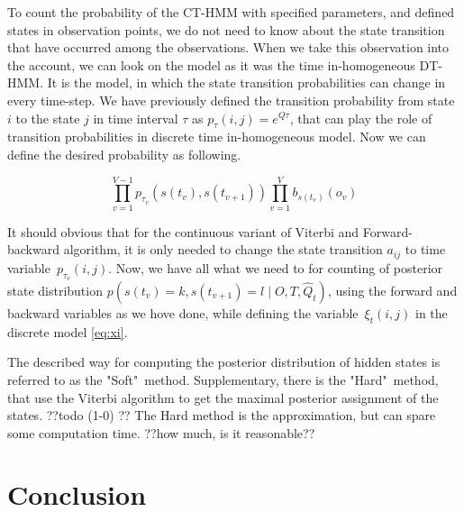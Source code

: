 \documentclass[thesis=M,english]{FITthesis}[2012/10/20]
\begin{document}
To count the probability of the CT-HMM with specified parameters, and defined states in observation points, we do not need to know about the state transition that have occurred among the observations.
When we take this observation into the account, we can look on the model as it was the time in-homogeneous DT-HMM. It is the model, in which the state transition probabilities can change in every time-step. We have previously defined the transition probability from state $i$ to the state $j$ in time interval $\tau$ as $p_{\tau}(i,j) = e^{Q \tau}$, that can play the role of transition probabilities in discrete time in-homogeneous model. Now we can define the desired probability as following.

\begin{equation}
\prod_{v=1}^{V-1} p_{\tau_v}(s(t_v),s(t_{v+1})) \prod_{v=1}^{V} b_{s(t_v)}(o_v)
\end{equation}

It should obvious that for the continuous variant of Viterbi and Forward-backward algorithm, it is only needed to change the state transition $a_{ij}$ to time variable~$p_{\tau_v}(i,j)$.   
Now, we have all what we need to for counting of posterior state distribution $p(s(t_v) = k,s(t_{v+1}) = l \mid O,T, \hat Q_t)$, using the forward and backward variables as we hove done, while defining the variable~$\xi_t(i,j)$ in the discrete model \eqref{eq:xi}.

The described way for computing the posterior distribution of hidden states is referred to as the "Soft"~method. Supplementary, there is the "Hard"~method, that use the Viterbi algorithm to get the maximal posterior assignment of the states. ??todo (1-0) ??  The Hard method is the approximation, but can spare some computation time. ??how much, is it reasonable??           
    







\chapter{Conclusion}
\end{document}
